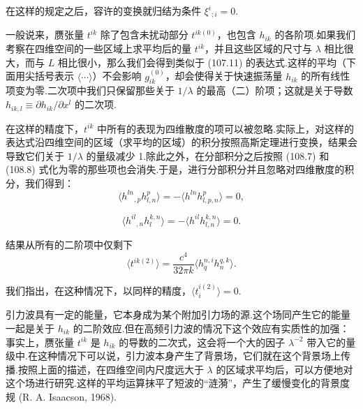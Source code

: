 在这样的规定之后，容许的变换就归结为条件 $\xi^i{}_{;i}=0$.

一般说来，赝张量 $t^{ik}$ 除了包含未扰动部分 $t^{ik(0)}$，也包含 $h_{ik}$ 的各阶项.如果我们考察在四维空间的一些区域上求平均后的量 $t^{ik}$，并且这些区域的尺寸与 $\lambda$ 相比很大，而与 $L$ 相比很小，那么我们会得到类似于 (107.11) 的表达式.这样的平均（下面用尖括号表示 $\langle\cdots\rangle$）不会影响 $g_{ik}^{(0)}$，却会使得关于快速振荡量 $h_{ik}$ 的所有线性项变为零.二次项中我们只保留那些关于 $1/\lambda$ 的最高（二）阶项；这就是关于导数 $h_{ik,l}\equiv\partial h_{ik}/\partial x^{l}$ 的二次项.

在这样的精度下，$t^{ik}$ 中所有的表现为四维散度的项可以被忽略.实际上，对这样的表达式沿四维空间的区域（求平均的区域）的积分按照高斯定理进行变换，结果会导致它们关于 $1/\lambda$ 的量级减少 1.除此之外，在分部积分之后按照 (108.7) 和 (108.8) 式化为零的那些项也会消失.于是，进行分部积分并且忽略对四维散度的积分，我们得到：
\begin{equation*}
  \langle h^{ln}{}_{,p}h_{l,n}^{p}\rangle
  =-\langle h^{ln}h_{l,p,n}^{p}\rangle=0,
\end{equation*}

\begin{equation*}
  \langle h^{il}{}_{,n}h_{l}^{k,n}\rangle
  =-\langle h^{il}h_{l,n}^{k,n}\rangle=0.
\end{equation*}

结果从所有的二阶项中仅剩下
\begin{equation}
  \langle t^{ik(2)}\rangle
  =\frac{c^{4}}{32\pi k}\langle h_q^{n,i}h_n^{q,k}\rangle.
\end{equation}

我们指出，在这种情况下，以同样的精度，$\langle t_i^{i(2)}\rangle=0$.

引力波具有一定的能量，它本身成为某个附加引力场的源.这个场同产生它的能量一起是关于 $h_{ik}$ 的二阶效应.但在高频引力波的情况下这个效应有实质性的加强：事实上，赝张量 $t^{ik}$ 是 $h_{ik}$ 的导数的二次式，这会将一个大的因子 $\lambda^{-2}$ 带入它的量级中.在这种情况下可以说，引力波本身产生了背景场，它们就在这个背景场上传播.按照上面的描述，在四维空间内尺度远大于 $\lambda$ 的区域求平均后，可以方便地对这个场进行研究.这样的平均运算抹平了短波的“涟漪”，产生了缓慢变化的背景度规 (R. A. Isaacson, 1968).

